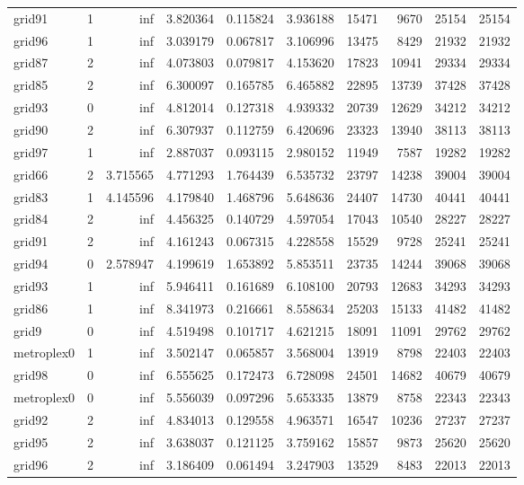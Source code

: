 \begin{longtable}{|l|r|r|r|r|r|r|r|r|r|}
grid91 & 1 & inf & 3.820364 & 0.115824 & 3.936188 & 15471 & 9670 & 25154 & 25154 \\
grid96 & 1 & inf & 3.039179 & 0.067817 & 3.106996 & 13475 & 8429 & 21932 & 21932 \\
grid87 & 2 & inf & 4.073803 & 0.079817 & 4.153620 & 17823 & 10941 & 29334 & 29334 \\
grid85 & 2 & inf & 6.300097 & 0.165785 & 6.465882 & 22895 & 13739 & 37428 & 37428 \\
grid93 & 0 & inf & 4.812014 & 0.127318 & 4.939332 & 20739 & 12629 & 34212 & 34212 \\
grid90 & 2 & inf & 6.307937 & 0.112759 & 6.420696 & 23323 & 13940 & 38113 & 38113 \\
grid97 & 1 & inf & 2.887037 & 0.093115 & 2.980152 & 11949 & 7587 & 19282 & 19282 \\
grid66 & 2 & 3.715565 & 4.771293 & 1.764439 & 6.535732 & 23797 & 14238 & 39004 & 39004 \\
grid83 & 1 & 4.145596 & 4.179840 & 1.468796 & 5.648636 & 24407 & 14730 & 40441 & 40441 \\
grid84 & 2 & inf & 4.456325 & 0.140729 & 4.597054 & 17043 & 10540 & 28227 & 28227 \\
grid91 & 2 & inf & 4.161243 & 0.067315 & 4.228558 & 15529 & 9728 & 25241 & 25241 \\
grid94 & 0 & 2.578947 & 4.199619 & 1.653892 & 5.853511 & 23735 & 14244 & 39068 & 39068 \\
grid93 & 1 & inf & 5.946411 & 0.161689 & 6.108100 & 20793 & 12683 & 34293 & 34293 \\
grid86 & 1 & inf & 8.341973 & 0.216661 & 8.558634 & 25203 & 15133 & 41482 & 41482 \\
grid9 & 0 & inf & 4.519498 & 0.101717 & 4.621215 & 18091 & 11091 & 29762 & 29762 \\
metroplex0 & 1 & inf & 3.502147 & 0.065857 & 3.568004 & 13919 & 8798 & 22403 & 22403 \\
grid98 & 0 & inf & 6.555625 & 0.172473 & 6.728098 & 24501 & 14682 & 40679 & 40679 \\
metroplex0 & 0 & inf & 5.556039 & 0.097296 & 5.653335 & 13879 & 8758 & 22343 & 22343 \\
grid92 & 2 & inf & 4.834013 & 0.129558 & 4.963571 & 16547 & 10236 & 27237 & 27237 \\
grid95 & 2 & inf & 3.638037 & 0.121125 & 3.759162 & 15857 & 9873 & 25620 & 25620 \\
grid96 & 2 & inf & 3.186409 & 0.061494 & 3.247903 & 13529 & 8483 & 22013 & 22013 \\

\end{longtable}

